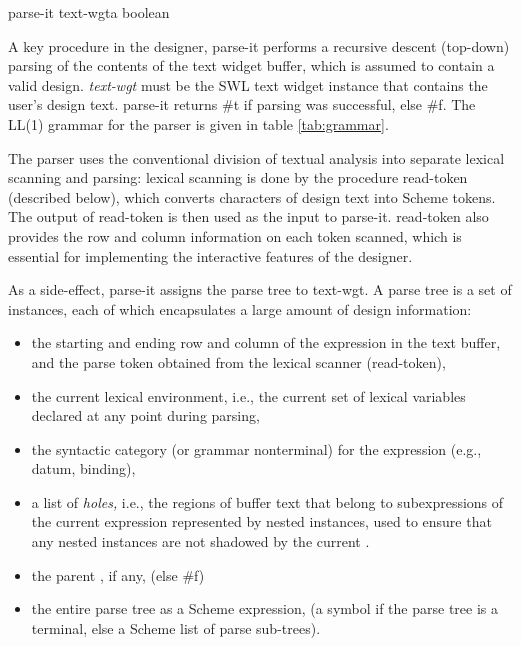 \documentclass{article}
\begin{document}
\begin{proc}{parse-it}{ text-wgt}{a boolean}

A key procedure in the designer, {\sf parse-it} performs a recursive
descent (top-down) parsing of the contents of the text widget buffer,
which is assumed to contain a valid design.  {\sl text-wgt} must be
the {\sc SWL} text widget instance that contains the user's design
text. {\sf parse-it} returns {\sf \#t} if parsing was successful, else
{\sf \#f}.  The LL(1) grammar for the parser is given in table
\ref{tab:grammar}.

The parser uses the conventional division of textual analysis into
separate lexical scanning and parsing: lexical scanning is done by the
procedure {\sf read-token} (described below), which converts
characters of design text into Scheme tokens. The output of {\sf
read-token} is then used as the input to {\sf parse-it}.  {\sf
read-token} also provides the row and column information on each token
scanned, which is essential for implementing the interactive features
of the designer.

As a side-effect, {\sf parse-it} assigns the parse tree to {\sf
text-wgt}. A parse tree is a set of  instances,
each of which encapsulates a large amount of design information:

\begin{itemize}

\item the starting and ending row and column of the expression in the
text buffer, and the parse token obtained from the lexical scanner
({\sf read-token}),

\item the current lexical environment, i.e., the current set of
lexical variables declared at any point during parsing,

\item the syntactic category (or grammar nonterminal) for the
expression (e.g., datum, binding),

\item a list of {\em holes,} i.e., the regions of buffer text that
belong to subexpressions of the current expression represented by
nested  instances, used to ensure that any nested
 instances are not shadowed by the current
.

\item the parent , if any, (else {\sf \#f})

\item the entire parse tree as a Scheme expression, (a symbol if the
parse tree is a terminal, else a Scheme list of parse sub-trees).


\end{itemize}
\end{proc}
\end{document}
